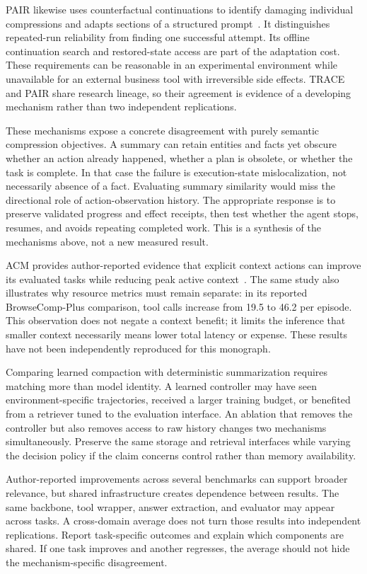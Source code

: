PAIR likewise uses counterfactual continuations to identify damaging individual compressions and adapts sections of a structured prompt~\cite{min2026pair}. It distinguishes repeated-run reliability from finding one successful attempt. Its offline continuation search and restored-state access are part of the adaptation cost. These requirements can be reasonable in an experimental environment while unavailable for an external business tool with irreversible side effects. TRACE and PAIR share research lineage, so their agreement is evidence of a developing mechanism rather than two independent replications.

These mechanisms expose a concrete disagreement with purely semantic compression objectives. A summary can retain entities and facts yet obscure whether an action already happened, whether a plan is obsolete, or whether the task is complete. In that case the failure is execution-state mislocalization, not necessarily absence of a fact. Evaluating summary similarity would miss the directional role of action-observation history. The appropriate response is to preserve validated progress and effect receipts, then test whether the agent stops, resumes, and avoids repeating completed work. This is a synthesis of the mechanisms above, not a new measured result.

ACM provides author-reported evidence that explicit context actions can improve its evaluated tasks while reducing peak active context~\cite{corpus260723809}. The same study also illustrates why resource metrics must remain separate: in its reported BrowseComp-Plus comparison, tool calls increase from 19.5 to 46.2 per episode. This observation does not negate a context benefit; it limits the inference that smaller context necessarily means lower total latency or expense. These results have not been independently reproduced for this monograph.

Comparing learned compaction with deterministic summarization requires matching more than model identity. A learned controller may have seen environment-specific trajectories, received a larger training budget, or benefited from a retriever tuned to the evaluation interface. An ablation that removes the controller but also removes access to raw history changes two mechanisms simultaneously. Preserve the same storage and retrieval interfaces while varying the decision policy if the claim concerns control rather than memory availability.

Author-reported improvements across several benchmarks can support broader relevance, but shared infrastructure creates dependence between results. The same backbone, tool wrapper, answer extraction, and evaluator may appear across tasks. A cross-domain average does not turn those results into independent replications. Report task-specific outcomes and explain which components are shared. If one task improves and another regresses, the average should not hide the mechanism-specific disagreement.

